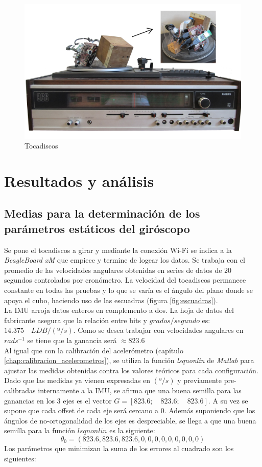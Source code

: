 \documentclass[main]{subfiles}
\begin{document}
\begin{figure}[h!]
	\centering
	\includegraphics[width=.9\textwidth]{./pics_gyro/tocadiscos.jpg}
	\caption{Tocadiscos}
	\label{fig:tocadiscos}
\end{figure}


\section{Resultados y análisis}
\subsection{Medias para la determinaci\'on de los par\'ametros est\'aticos del giróscopo}
Se pone el tocadiscos a girar y mediante la conexión Wi-Fi se indica a la \emph{BeagleBoard xM} que empiece y termine de logear los datos. Se trabaja con el promedio de las velocidades angulares obtenidas en series de datos de 20 segundos controlados por cronómetro. La velocidad del tocadiscos permanece constante en todas las pruebas y lo que se varía es el ángulo del plano donde se apoya el cubo, haciendo uso de las escuadras (figura \ref{fig:escuadras}).\\

La IMU arroja datos enteros en complemento a dos. La hoja de datos del fabricante asegura que la relaci\'on entre bits y $grados/segundo$ es: $14.375\quad LDB/(º/s)$. Como se desea trabajar con velocidades angulares en $rad s^{-1}$ se tiene que la ganancia ser\'a $\approx 823.6$\\

Al igual que con la calibración del acelerómetro (capítulo \ref{chap:calibracion_acelerometros}), se utiliza la función \emph{lsqnonlin} de \emph{Matlab} para ajustar las medidas obtenidas contra los valores teóricos para cada configuración. Dado que las medidas ya vienen expresadas en $(º/s)$ y previamente pre-calibradas internamente a la IMU, se afirma que una buena semilla para las ganancias en los 3 ejes es el vector $G=[823.6;\quad 823.6;\quad 823.6]$. A su vez se supone que cada offset de cada eje será cercano a 0. Además suponiendo que los ángulos de no-ortogonalidad de los ejes es despreciable, se llega a que una buena semilla para la función $lsqnonlin$ es la siguiente:
$$\theta _0=\left(823.6,823.6,823.6,0,0,0,0,0,0,0,0,0\right)$$
Los parámetros que minimizan la suma de los errores al cuadrado son los siguientes:
\end{document}
